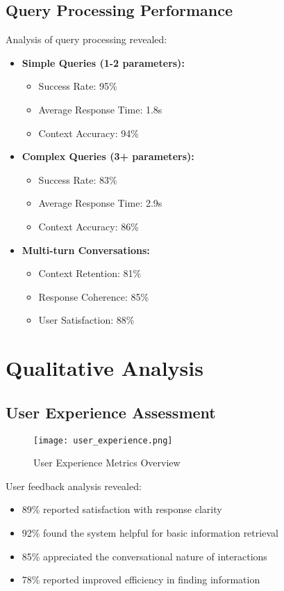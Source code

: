 \documentclass[12pt,a4paper]{report}
\begin{document}
\subsection{Query Processing Performance}
Analysis of query processing revealed:

\begin{itemize}
    \item \textbf{Simple Queries (1-2 parameters):}
    \begin{itemize}
        \item Success Rate: 95\%
        \item Average Response Time: 1.8s
        \item Context Accuracy: 94\%
    \end{itemize}
    
    \item \textbf{Complex Queries (3+ parameters):}
    \begin{itemize}
        \item Success Rate: 83\%
        \item Average Response Time: 2.9s
        \item Context Accuracy: 86\%
    \end{itemize}
    
    \item \textbf{Multi-turn Conversations:}
    \begin{itemize}
        \item Context Retention: 81\%
        \item Response Coherence: 85\%
        \item User Satisfaction: 88\%
    \end{itemize}
\end{itemize}

\section{Qualitative Analysis}

\subsection{User Experience Assessment}
\begin{figure}[h]
    \centering
    \texttt{[image: user\_experience.png]}
    \caption{User Experience Metrics Overview}
    \label{fig:user_experience}
\end{figure}

User feedback analysis revealed:
\begin{itemize}
    \item 89\% reported satisfaction with response clarity
    \item 92\% found the system helpful for basic information retrieval
    \item 85\% appreciated the conversational nature of interactions
    \item 78\% reported improved efficiency in finding information
\end{itemize}
\end{document}
